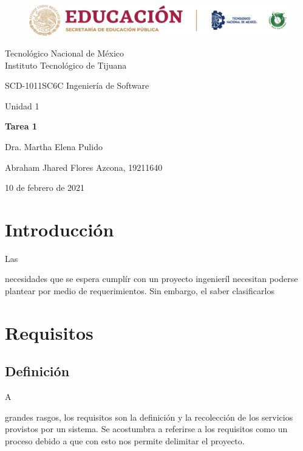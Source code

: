 \documentclass[stu, 12pt, letterpaper, donotrepeattitle, floatsintext, natbib]{apa7}
\begin{document}
    \begin{titlepage}
        \begin{figure}[ht]
            \centering
            \includegraphics[width=15cm]{logosITT.png}
        \end{figure}
        \centering
        {\Large Tecnológico Nacional de México\\Instituto Tecnológico de Tijuana\par}
        \vspace{1cm}
        {\Large SCD-1011SC6C Ingeniería de Software\par}
        \vspace{1cm}
        {\Large Unidad 1\par}
        \vspace{2cm}
        {\Large\bfseries Tarea 1\par}
        \vspace{2cm}
        {\large Dra. Martha Elena Pulido\par}
        \vfill
            {\large Abraham Jhared Flores Azcona, 19211640\par}
        \vfill
        {\large 10 de febrero de 2021}
    \end{titlepage}

\renewcommand\contentsname{Contenido}
\tableofcontents

\newpage
\section{Introducción}
Las \begin{justifying}
    necesidades que se espera cumplír con un proyecto ingenieríl necesitan poderse plantear por medio de requerimientos. Sin embargo, el saber clasificarlos
    \end{justifying}
\vspace{\baselineskip}    
\section{Requisitos}
\subsection{Definición}
A \begin{justifying}
    grandes rasgos, los requisitos son la definición y la recolección de los servicios provistos por un sistema. Se acostumbra
    a referirse a los requisitos como un proceso debido a que con esto nos permite delimitar el proyecto. \citep{geeksforgeeks-2020}\par
  \end{justifying}
\vspace{\baselineskip}
\end{document}
